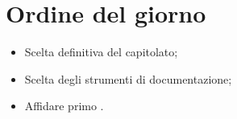 \section{Ordine del giorno}
\begin{itemize}
\item Scelta definitiva del capitolato;
\item Scelta degli strumenti di documentazione;
\item Affidare primo \SdF{}.

\end{itemize}
